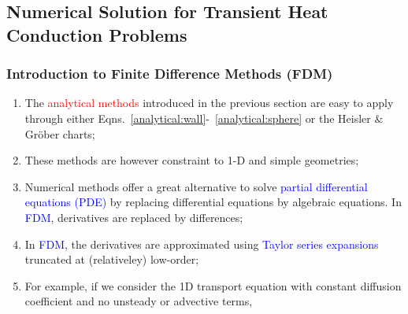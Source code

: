 \documentclass[10pt,compress,unknownkeysallowed]{beamer}
\newcommand{\red}{\textcolor{red}}
\newcommand{\blue}{\textcolor{blue}}
\begin{document}
\subsection{Numerical Solution for Transient Heat Conduction Problems}

\begin{frame}
  \frametitle{Introduction to Finite Difference Methods (FDM)}
  \begin{enumerate}
     \item<1-> The \red{analytical methods} introduced in the previous section are easy to apply through either Eqns.~\ref{analytical:wall}-~\ref{analytical:sphere} or the Heisler $\&$ Gr\"ober charts;
     \item<1-> These methods are however constraint to 1-D and simple geometries;
     \item<2-> Numerical methods offer a great alternative to solve \blue{partial differential equations (PDE)} by replacing differential equations by algebraic equations. In \blue{FDM}, derivatives are replaced by differences; 
     \item<3-> In \blue{FDM}, the derivatives are approximated using \blue{Taylor series expansions} truncated at (relativeley) low-order;
     \item<3-> For example, if we consider the 1D transport equation with constant diffusion coefficient and no unsteady or advective terms,
  \end{enumerate}
\end{frame}
\end{document}
